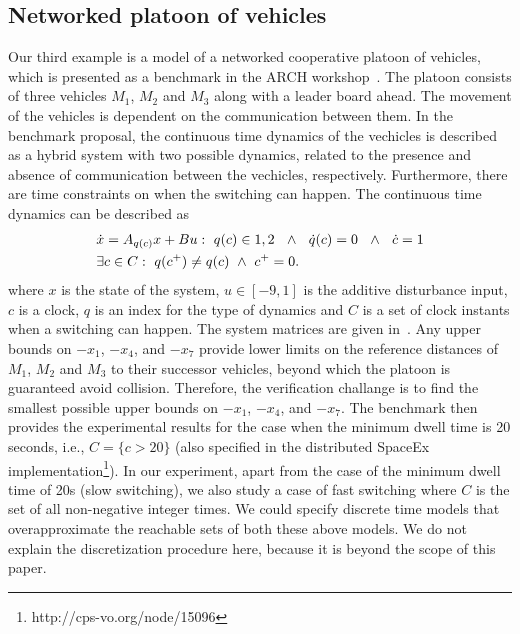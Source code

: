 
\subsection{Networked platoon of vehicles}
Our third example is a model of a networked cooperative platoon of
vehicles, which is presented as a benchmark in the ARCH
workshop~\cite{makhlouf2014networked}.  The platoon consists of three
vehicles $M_1$, $M_2$ and $M_3$ along with a leader board ahead.  The
movement of the vehicles is dependent on the communication between
them.  In the benchmark proposal, the continuous time dynamics of the
vechicles is described as a hybrid system with two possible dynamics,
related to the presence and absence of communication between the
vechicles, respectively.  Furthermore, there are time constraints on
when the switching can happen.  The continuous time dynamics can be
described as 
\vspace{-0.75em}
 \begin{align*} &\dot{x} = A_{q(c)}x+B
u:~q(c)\in{1,2}~~\wedge~~\dot{q}(c)=0~~\wedge~~\dot{c}=1\\ &\exists
c\in C:~q(c^+)\neq q(c)~\wedge~c^+=0.
\vspace{-2em}
\end{align*}
where $x$ is the state of the system, $u\in[-9,1]$ is the additive
disturbance input, $c$ is a clock, $q$ is an index
for the type of dynamics and $C$ is a set of clock instants when a
switching can happen.  The system matrices are given in~\cite{makhlouf2014networked}.
%
 Any upper bounds on $-x_1$, $-x_4$, and $-x_7$ provide lower limits
 on the reference distances of $M_1$, $M_2$ and $M_3$ to their
 successor vehicles, beyond which the platoon is guaranteed avoid
 collision.  Therefore, the verification challange is to find the
 smallest possible upper bounds on $-x_1$, $-x_4$, and $-x_7$.  The
 benchmark then provides the experimental results for the case when
 the minimum dwell time is 20 seconds, i.e., $C=\{c>20\}$ (also
 specified in the distributed SpaceEx
 implementation\footnote{http://cps-vo.org/node/15096}).  In our
 experiment, apart from the case of the minimum dwell time of 20s
 (slow switching), we also study a case of fast switching where $C$ is
 the set of all non-negative integer times.  We could specify discrete time
 models that overapproximate the reachable sets of both these above
 models.  We do not explain the discretization procedure here, because
 it is beyond the scope of this paper.

